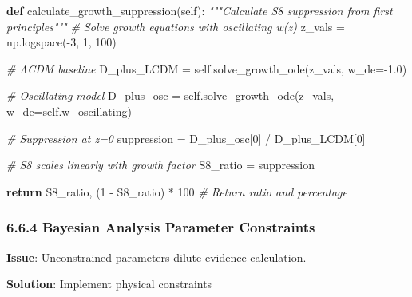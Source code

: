 \documentclass[
  11pt,
]{report}
\newenvironment{Shaded}{}{}
\newcommand{\CommentTok}[1]{\textcolor[rgb]{0.38,0.63,0.69}{\textit{#1}}}
\newcommand{\ControlFlowTok}[1]{\textcolor[rgb]{0.00,0.44,0.13}{\textbf{#1}}}
\newcommand{\DecValTok}[1]{\textcolor[rgb]{0.25,0.63,0.44}{#1}}
\newcommand{\FloatTok}[1]{\textcolor[rgb]{0.25,0.63,0.44}{#1}}
\newcommand{\KeywordTok}[1]{\textcolor[rgb]{0.00,0.44,0.13}{\textbf{#1}}}
\newcommand{\NormalTok}[1]{#1}
\newcommand{\OperatorTok}[1]{\textcolor[rgb]{0.40,0.40,0.40}{#1}}
\newcommand{\VariableTok}[1]{\textcolor[rgb]{0.10,0.09,0.49}{#1}}
\begin{document}
\begin{Shaded}
\begin{Highlighting}[]
\KeywordTok{def}\NormalTok{ calculate\_growth\_suppression(}\VariableTok{self}\NormalTok{):}
    \CommentTok{"""Calculate S8 suppression from first principles"""}
    \CommentTok{\# Solve growth equations with oscillating w(z)}
\NormalTok{    z\_vals }\OperatorTok{=}\NormalTok{ np.logspace(}\OperatorTok{{-}}\DecValTok{3}\NormalTok{, }\DecValTok{1}\NormalTok{, }\DecValTok{100}\NormalTok{)}
    
    \CommentTok{\# ΛCDM baseline}
\NormalTok{    D\_plus\_LCDM }\OperatorTok{=} \VariableTok{self}\NormalTok{.solve\_growth\_ode(z\_vals, w\_de}\OperatorTok{={-}}\FloatTok{1.0}\NormalTok{)}
    
    \CommentTok{\# Oscillating model}
\NormalTok{    D\_plus\_osc }\OperatorTok{=} \VariableTok{self}\NormalTok{.solve\_growth\_ode(z\_vals, w\_de}\OperatorTok{=}\VariableTok{self}\NormalTok{.w\_oscillating)}
    
    \CommentTok{\# Suppression at z=0}
\NormalTok{    suppression }\OperatorTok{=}\NormalTok{ D\_plus\_osc[}\DecValTok{0}\NormalTok{] }\OperatorTok{/}\NormalTok{ D\_plus\_LCDM[}\DecValTok{0}\NormalTok{]}
    
    \CommentTok{\# S8 scales linearly with growth factor}
\NormalTok{    S8\_ratio }\OperatorTok{=}\NormalTok{ suppression}
    
    \ControlFlowTok{return}\NormalTok{ S8\_ratio, (}\DecValTok{1} \OperatorTok{{-}}\NormalTok{ S8\_ratio) }\OperatorTok{*} \DecValTok{100}  \CommentTok{\# Return ratio and percentage}
\end{Highlighting}
\end{Shaded}

\subsubsection{6.6.4 Bayesian Analysis Parameter
Constraints}\label{bayesian-analysis-parameter-constraints}

\textbf{Issue}: Unconstrained parameters dilute evidence calculation.

\textbf{Solution}: Implement physical constraints
\end{document}

